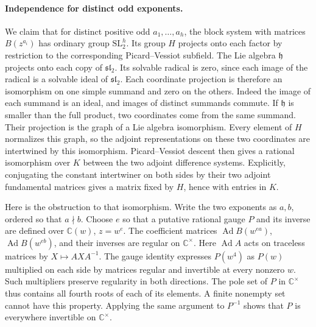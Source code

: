 \documentclass[11pt,a4paper]{article}
\theoremstyle{definition}
\theoremstyle{remark}
\numberwithin{equation}{section}
\begin{document}
\paragraph{Independence for distinct odd exponents.}
We claim that for distinct positive odd \(a_1,\ldots,a_h\), the block system with matrices \(B(z^{a_i})\) has ordinary group \(\mathrm{SL}_2^h\).
Its group \(H\) projects onto each factor by restriction to the corresponding Picard--Vessiot subfield. The Lie algebra \(\mathfrak h\) projects onto each copy of \(\mathfrak{sl}_2\). Its solvable radical is zero, since each image of the radical is a solvable ideal of \(\mathfrak{sl}_2\). Each coordinate projection is therefore an isomorphism on one simple summand and zero on the others. Indeed the image of each summand is an ideal, and images of distinct summands commute. If \(\mathfrak h\) is smaller than the full product, two coordinates come from the same summand. Their projection is the graph of a Lie algebra isomorphism. Every element of \(H\) normalizes this graph, so the adjoint representations on these two coordinates are intertwined by this isomorphism. Picard--Vessiot descent then gives a rational isomorphism over \(K\) between the two adjoint difference systems. Explicitly, conjugating the constant intertwiner on both sides by their two adjoint fundamental matrices gives a matrix fixed by \(H\), hence with entries in \(K\).

Here is the obstruction to that isomorphism. Write the two exponents as \(a,b\), ordered so that \(a\nmid b\). Choose \(e\) so that a putative rational gauge \(P\) and its inverse are defined over \(\mathbb C(w)\), \(z=w^e\). The coefficient matrices \(\operatorname{Ad}B(w^{ea})\), \(\operatorname{Ad}B(w^{eb})\), and their inverses are regular on \(\mathbb C^\times\). Here \(\operatorname{Ad}A\) acts on traceless matrices by \(X\mapsto AXA^{-1}\). The gauge identity expresses \(P(w^4)\) as \(P(w)\) multiplied on each side by matrices regular and invertible at every nonzero \(w\). Such multipliers preserve regularity in both directions. The pole set of \(P\) in \(\mathbb C^\times\) thus contains all fourth roots of each of its elements. A finite nonempty set cannot have this property. Applying the same argument to \(P^{-1}\) shows that \(P\) is everywhere invertible on \(\mathbb C^\times\).
\end{document}
